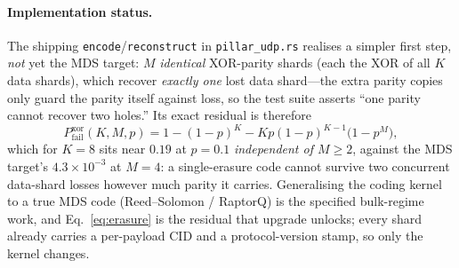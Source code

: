 \documentclass[10pt,twocolumn]{article}
\newcommand{\code}[1]{\texttt{\small #1}}
\begin{document}
\paragraph{Implementation status.}
The shipping \code{encode}/\code{reconstruct} in \code{pillar\_udp.rs} realises a
simpler first step, \emph{not} yet the MDS target: $M$ \emph{identical}
XOR-parity shards (each the XOR of all $K$ data shards), which recover
\emph{exactly one} lost data shard---the extra parity copies only guard the
parity itself against loss, so the test suite asserts ``one parity cannot recover
two holes.'' Its exact residual is therefore
\begin{equation}
  P^{\text{xor}}_{\text{fail}}(K,M,p)=1-(1-p)^{K}-Kp(1-p)^{K-1}\big(1-p^{M}\big),
  \label{eq:xor}
\end{equation}
which for $K{=}8$ sits near $0.19$ at $p{=}0.1$ \emph{independent of $M\ge2$},
against the MDS target's $4.3\times10^{-3}$ at $M{=}4$: a single-erasure code
cannot survive two concurrent data-shard losses however much parity it carries.
Generalising the coding kernel to a true MDS code (Reed--Solomon / RaptorQ) is
the specified bulk-regime work, and Eq.~\eqref{eq:erasure} is the residual that
upgrade unlocks; every shard already carries a per-payload CID and a
protocol-version stamp, so only the kernel changes.
\end{document}
